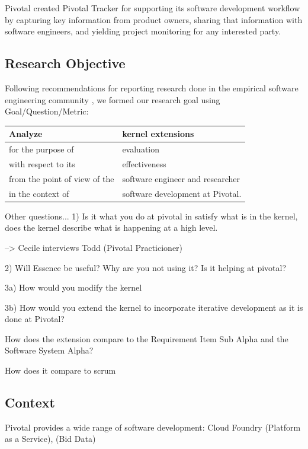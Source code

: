 \documentclass[preprint,12pt,3p]{elsarticle}
\begin{document}
Pivotal created Pivotal Tracker for supporting its software development workflow by capturing key information from product owners, sharing that information with software engineers, and yielding project monitoring for any interested party.

\subsection{Research Objective}
Following recommendations for reporting research done in the empirical
software engineering community
\cite{GQM, Shaw}, we formed our
research goal using Goal/Question/Metric:
\cite{GQM}

\begin{table}[h]
\centering
\begin{tabular}{|p{1.00in}|p{2.10in}|}
\hline
Analyze & kernel extensions \\ \hline
for the purpose of & evaluation \\ \hline
with respect to its & effectiveness \\ \hline
from the point of view of the & software engineer and researcher \\ \hline
in the context of & software development at Pivotal. \\
\hline
\end{tabular}
\end{table}

Other questions...
1) Is it what you do at pivotal in satisfy what is in the kernel, does the kernel describe what is happening at a high level. 

--> Cecile interviews Todd (Pivotal Practicioner)

2) Will Essence be useful? Why are you not using it? Is it helping at pivotal? 

3a) How would you modify the kernel 

3b) How would you extend the kernel to incorporate iterative development as it is done at Pivotal?

How does the extension compare to the Requirement Item Sub Alpha and the Software System Alpha? 

How does it compare to scrum


\subsection{Context}
Pivotal provides a wide range of software development: Cloud Foundry (Platform as a Service),  (Bid Data)
\end{document}
